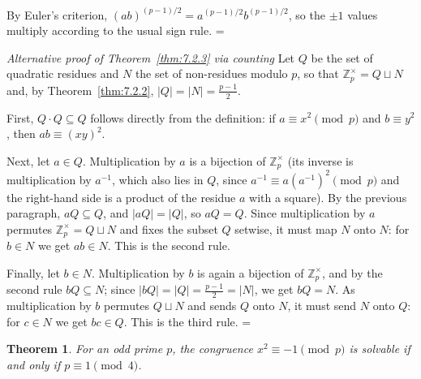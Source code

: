 \documentclass[11pt]{article}
\makeatletter
\theoremstyle{ntstyle}
\newtheorem{theorem}{Theorem}[subsection]
\let\nt@closedisplay\]
\def\nt@guardedclose{\@ifnextchar\par{\nt@closeafterpar}{\@ifnextchar\end{\postdisplaypenalty\@M\nt@closedisplay}{\nt@closedisplay}}}
\def\nt@closeafterpar\par{\@ifnextchar\par{\nt@closeafterpar}{\@ifnextchar\end{\postdisplaypenalty\@M\nt@closedisplay\par}{\nt@closedisplay\par}}}
\renewenvironment{proof}[1][\proofname]{\par
  \pushQED{\qed}\normalfont\topsep\medskipamount\edef\nt@afterproof{\@endparpenalty=\the\@endparpenalty\relax}\@beginparpenalty\@M\@endparpenalty\@M\let\]\nt@guardedclose\trivlist\item[]\textit{#1\@addpunct{.}} \ignorespaces}{\ifvmode\addpenalty\@M\fi\popQED\nt@afterproof\endtrivlist\@endpefalse}
\newenvironment{altproof}[1][\proofname]{\begin{proof}[#1]}{\end{proof}}
\newcommand{\ZmodUnits}[1]{\mathbb{Z}_{#1}^{\times}}
\makeatother
\begin{document}
\begin{proof} By Euler's criterion, $(ab)^{(p-1)/2} =
		a^{(p-1)/2} b^{(p-1)/2}$, so the $\pm 1$ values multiply according to the usual sign rule.
\end{proof}
\begin{altproof}[Alternative proof of Theorem~\ref{thm:7.2.3} via counting] Let
	$Q$ be the set of quadratic residues and $N$ the set of non-residues
	modulo $p$, so that $\ZmodUnits{p} = Q \sqcup N$ and, by
	Theorem~\ref{thm:7.2.2}, $|Q| = |N| = \tfrac{p-1}{2}$.

	First, $Q \cdot Q \subseteq Q$ follows directly from the definition: if $a
		\equiv x^{2} \pmod{p}$ and $b \equiv y^{2}$, then $ab \equiv (xy)^{2}$.

	Next, let $a \in Q$. Multiplication by $a$ is a bijection of
	$\ZmodUnits{p}$ (its inverse is multiplication by $a^{-1}$,
	which also lies in $Q$, since $a^{-1} \equiv a(a^{-1})^{2} \pmod{p}$ and the right-hand side is a
		product of the residue $a$ with a square). By the previous paragraph,
	$aQ \subseteq Q$, and $|aQ| = |Q|$, so $aQ = Q$. Since multiplication
		by $a$ permutes $\ZmodUnits{p} = Q \sqcup N$ and fixes the
		subset $Q$ setwise, it must map $N$ onto $N$: for $b \in N$ we get $ab
	\in N$. This is the second rule.

		Finally, let $b \in N$. Multiplication by $b$ is again a bijection of
	$\ZmodUnits{p}$, and by the second rule $bQ \subseteq N$;
		since $|bQ| = |Q| = \tfrac{p-1}{2} = |N|$, we get $bQ = N$. As
		multiplication by $b$ permutes $Q \sqcup N$ and sends $Q$ onto $N$, it
		must send $N$ onto $Q$: for $c \in N$ we get $bc \in Q$. This is the
	third rule.
\end{altproof}
\begin{theorem}\label{thm:7.2.4} For an odd
	prime $p$, the congruence $x^{2} \equiv -1 \pmod{p}$ is solvable if and
	only if $p \equiv 1 \pmod{4}$.
\end{theorem}
\end{document}
